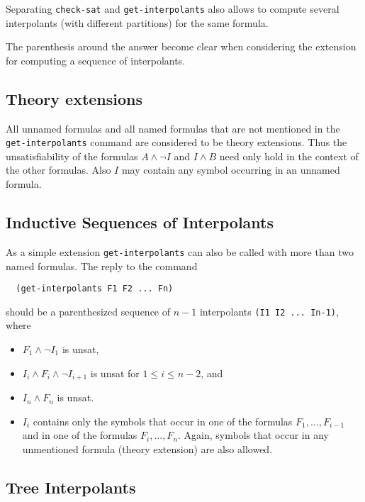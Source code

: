 \documentclass[a4paper,12pt]{article}
\begin{document}
Separating \texttt{check-sat} and \texttt{get-interpolants} also
allows to compute several interpolants (with different partitions) for
the same formula.

The parenthesis around the answer become clear when considering the
extension for computing a sequence of interpolants.

\subsection*{Theory extensions}
All unnamed formulas and all named formulas that are not mentioned in
the \texttt{get-interpolants} command are considered to be theory
extensions.  Thus the unsatisfiability of the formulas $A\land \lnot
I$ and $I\land B$ need only hold in the context of the other
formulas.  Also $I$ may contain any symbol occurring in an unnamed
formula.

\subsection*{Inductive Sequences of Interpolants}
As a simple extension \texttt{get-interpolants} can also be called
with more than two named formulas.  The reply to the command
\begin{verbatim}
  (get-interpolants F1 F2 ... Fn)
\end{verbatim}
should be a parenthesized sequence of $n-1$ interpolants 
\verb+(I1 I2 ... In-1)+, where
\begin{itemize}
\item $F_1\land \lnot I_1$ is unsat,
\item $I_i\land F_i \land \lnot I_{i+1}$ is unsat for $1\leq i \leq n-2$, and
\item $I_n\land F_n$ is unsat.
\item $I_i$ contains only the symbols that occur in one of the
  formulas $F_1,\dots,F_{i-1}$ and in one of the formulas
  $F_i,\dots,F_n$.  Again, symbols that occur in any unmentioned
  formula (theory extension) are also allowed.
\end{itemize}

\subsection*{Tree Interpolants}
\end{document}

